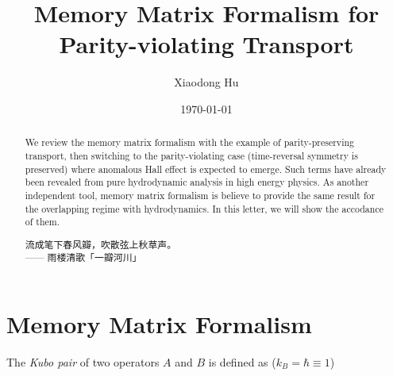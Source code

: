 \documentclass[10pt,nofootinbib,letterpaper]{revtex4}
\begin{document}
\title{Memory Matrix Formalism for Parity-violating Transport}
\author{Xiaodong Hu}

\date{\today}

\begin{abstract}
	We review the memory matrix formalism with the example of parity-preserving transport, then switching to the parity-violating case (time-reversal symmetry is preserved) where anomalous Hall effect is expected to emerge. Such terms have already been revealed from pure hydrodynamic analysis in high energy physics. As another independent tool, memory matrix formalism is believe to provide the same result for the overlapping regime with hydrodynamics. In this letter, we will show the accodance of them.\par
		\hfill\par
		{\centering\kaishu 流成笔下春风瓣，吹散弦上秋草声。\\[0.5em]}
	\hfill------ 雨楼清歌「一瓣河川」
\end{abstract}

\maketitle
\tableofcontents

\section{Memory Matrix Formalism}
			The \emph{Kubo pair} \cite{kubo1957statistical} of two operators $A$ and $B$ is defined as ($k_B=\hbar\equiv1$)
\end{document}
